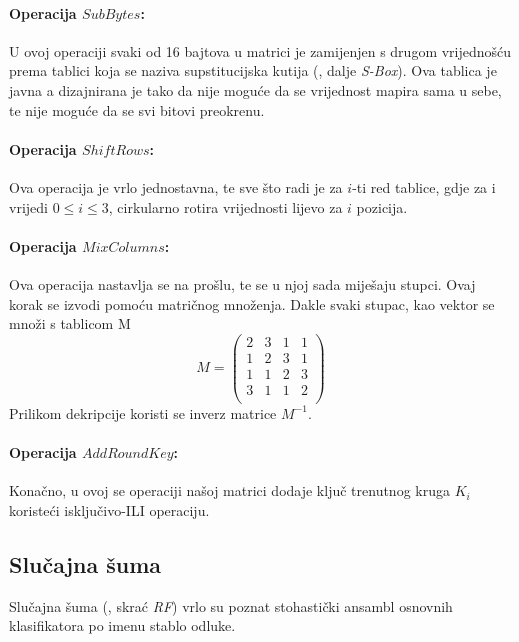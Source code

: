 \documentclass[times, utf8, diplomski]{fer}
\begin{document}
\paragraph{Operacija $SubBytes$:} U ovoj operaciji svaki od 16 bajtova u matrici je zamijenjen s drugom vrijednošću prema tablici koja se naziva supstitucijska kutija (, dalje \emph{S-Box}). Ova tablica je javna a dizajnirana je tako da nije moguće da se vrijednost mapira sama u sebe, te nije moguće da se svi bitovi preokrenu.

\paragraph{Operacija $ShiftRows$:} Ova operacija je vrlo jednostavna, te sve što radi je za $i$-ti red tablice, gdje za i vrijedi $0 \le i \le 3$, cirkularno rotira vrijednosti lijevo za $i$ pozicija.

\paragraph{Operacija $MixColumns$:} Ova operacija nastavlja se na prošlu, te se u njoj sada miješaju stupci. Ovaj korak se izvodi pomoću matričnog množenja. Dakle svaki stupac, kao vektor se množi s tablicom M
\[
    M =
    \begin{pmatrix}
        2 & 3 & 1 & 1 \\
        1 & 2 & 3 & 1 \\
        1 & 1 & 2 & 3 \\
        3 & 1 & 1 & 2 \\
    \end{pmatrix}
\]
Prilikom dekripcije koristi se inverz matrice $M^{-1}$.

\paragraph{Operacija $AddRoundKey$:} Konačno, u ovoj se operaciji našoj matrici dodaje ključ trenutnog kruga $K_i$ koristeći isključivo-ILI operaciju.

\subsection{Slučajna šuma}

Slučajna šuma (, skrać \emph{RF}) vrlo su poznat stohastički ansambl osnovnih klasifikatora po imenu stablo odluke.
\end{document}
